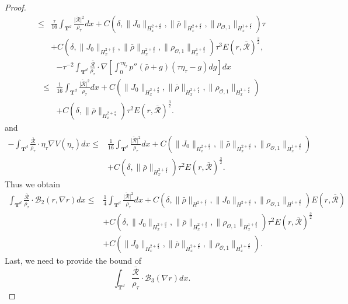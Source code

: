 \documentclass[english]{amsart}
\theoremstyle{plain}
\theoremstyle{definition}
\theoremstyle{remark}
\theoremstyle{plain}
\theoremstyle{plain}
\theoremstyle{plain}
\def\T{{\mathbf T}}%
\numberwithin{equation}{section}
\begin{document}
\begin{proof}
\begin{align*}
\leq &\frac{\tau}{16}\int_{\T^d} \frac{\overline{|\mathcal{R}}|^2}{\rho_\tau}dx+C(\delta,\|J_0\|_{H^{2+\frac{d}{2}}_x},\|\bar\rho\|_{H^{2+\frac{d}{2}}_x},\|\rho_{\mathcal{O},1}\|_{H^{1+\frac{d}{2}}_x})\tau\\
&+C(\delta,\|J_0\|_{H^{2+\frac{d}{2}}_x},\|\bar\rho\|_{H^{2+\frac{d}{2}}_x},\|\rho_{\mathcal{O},1}\|_{H^{1+\frac{d}{2}}_x})\tau^3E(r,\overline{\mathcal{R}})^\frac32,
\end{align*}
\begin{align*}
&-\tau^{-2}\int_{\T^d} \frac{\overline{\mathcal{R}}}{\rho_\tau}\cdot\nabla\left[\int_0^{\tau \eta_\tau} p''(\bar\rho+g)(\tau \eta_\tau-g)dg\right]dx\\
\leq & \frac{1}{16}\int_{\T^d} \frac{\overline{|\mathcal{R}}|^2}{\rho_\tau}dx+C(\|J_0\|_{H^{2+\frac{d}{2}}_x},\|\bar\rho\|_{H^{2+\frac{d}{2}}_x},\|\rho_{\mathcal{O},1}\|_{H^{1+\frac{d}{2}}_x})\\
&+C(\delta,\|\bar\rho\|_{H^{2+\frac{d}{2}}_x})\tau^2E(r,\overline{\mathcal{R}})^\frac32.
\end{align*}
and
\begin{align*}
-\int_{\T^d} \frac{\overline{\mathcal{R}}}{\rho_\tau}\cdot\eta_\tau\nabla V(\eta_\tau)dx\leq &\frac{1}{16}\int_{\T^d} \frac{\overline{|\mathcal{R}}|^2}{\rho_\tau}dx+C(\|J_0\|_{H^{2+\frac{d}{2}}_x},\|\bar\rho\|_{H^{2+\frac{d}{2}}_x},\|\rho_{\mathcal{O},1}\|_{H^{1+\frac{d}{2}}_x})\\
&+C(\delta,\|\bar\rho\|_{H^{2+\frac{d}{2}}_x})\tau^2E(r,\overline{\mathcal{R}})^\frac32.
\end{align*}
Thus we obtain
\begin{equation}\label{eq:estS_6}
\begin{aligned}
\int_{\T^d} \frac{\overline{\mathcal{R}}}{\rho_\tau}\cdot\mathcal{B}_2(r,\nabla r)dx\leq & \frac14 \int_{\T^d} \frac{\overline{|\mathcal{R}}|^2}{\rho_\tau}dx+C(\delta,\|\bar\rho\|_{H^{2+\frac{d}{2}}},\|J_0\|_{H^{2+\frac{d}{2}}},\|\rho_{\mathcal{O},1}\|_{H^{1+\frac{d}{2}}})E(r,\overline{\mathcal{R}})\\
&+C(\delta,\|J_0\|_{H^{2+\frac{d}{2}}_x},\|\bar\rho\|_{H^{2+\frac{d}{2}}_x},\|\rho_{\mathcal{O},1}\|_{H^{1+\frac{d}{2}}_x})\tau^2 E(r,\overline{\mathcal{R}})^\frac32\\
&+C(\|J_0\|_{H^{2+\frac{d}{2}}_x},\|\bar\rho\|_{H^{2+\frac{d}{2}}_x},\|\rho_{\mathcal{O},1}\|_{H^{1+\frac{d}{2}}_x}).
\end{aligned}
\end{equation}
Last, we need to provide the bound of 
\[
\int_{\T^d}\frac{\overline{\mathcal{R}}}{\rho_\tau}\cdot\mathcal{B}_3(\nabla r)dx.
\]
\end{proof}
\end{document}
